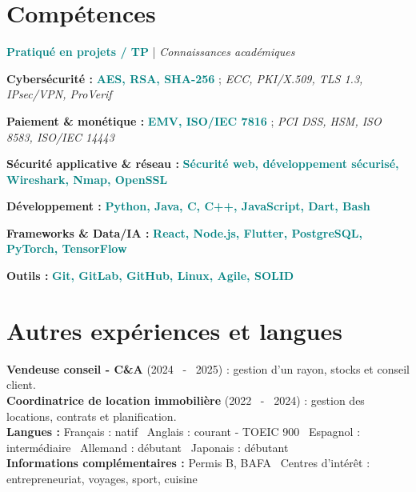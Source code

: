 \documentclass[10pt,a4paper]{article}
\newcommand{\sm}[1]{{\fontsize{8.5}{10.2}\selectfont #1}}
\begin{document}
\section{Compétences}
{\fontsize{7.85}{9.7}\selectfont
\textcolor{teal}{\textbf{Pratiqué en projets / TP}} \quad | \quad \textcolor{muted}{\textit{Connaissances académiques}}\par\vspace{4pt}
\textbf{Cybersécurité :} \textcolor{teal}{\textbf{AES, RSA, SHA-256}} ; \textcolor{muted}{\textit{ECC, PKI/X.509, TLS 1.3, IPsec/VPN, ProVerif}}\par\vspace{2pt}
\textbf{Paiement \& monétique :} \textcolor{teal}{\textbf{EMV, ISO/IEC 7816}} ; \textcolor{muted}{\textit{PCI DSS, HSM, ISO 8583, ISO/IEC 14443}}\par\vspace{2pt}
\textbf{Sécurité applicative \& réseau :} \textcolor{teal}{\textbf{Sécurité web, développement sécurisé, Wireshark, Nmap, OpenSSL}}\par\vspace{2pt}
\textbf{Développement :} \textcolor{teal}{\textbf{Python, Java, C, C++, JavaScript, Dart, Bash}}\par\vspace{2pt}
\textbf{Frameworks \& Data/IA :} \textcolor{teal}{\textbf{React, Node.js, Flutter, PostgreSQL, PyTorch, TensorFlow}}\par\vspace{2pt}
\textbf{Outils :} \textcolor{teal}{\textbf{Git, GitLab, GitHub, Linux, Agile, SOLID}}
}

\section{Autres expériences et langues}
\sm{\textbf{Vendeuse conseil - C\&A} \textcolor{muted}{(2024 \ - \ 2025)} : gestion d'un rayon, stocks et conseil client.\\[2pt]
\textbf{Coordinatrice de location immobilière} \textcolor{muted}{(2022 \ - \ 2024)} : gestion des locations, contrats et planification.\\[3pt]
\textbf{Langues :} Français : natif \textbar\ Anglais : courant - TOEIC 900 \textbar\ Espagnol : intermédiaire \textbar\ Allemand : débutant \textbar\ Japonais : débutant\\[3pt]
\textbf{Informations complémentaires :} Permis B, BAFA \textbar\ Centres d'intérêt : entrepreneuriat, voyages, sport, cuisine}
\end{document}
